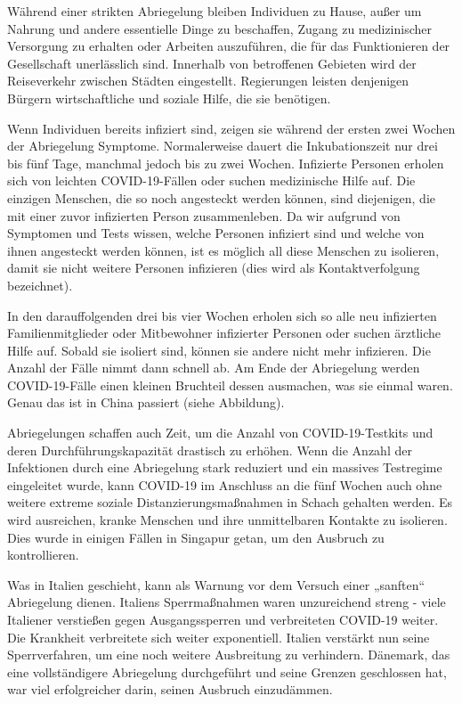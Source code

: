 \documentclass[onecolumn,journal]{IEEEtran}
\begin{document}
\begin{multicols}{2}

Während einer strikten Abriegelung bleiben Individuen zu Hause, außer um Nahrung und andere essentielle Dinge zu beschaffen, Zugang zu medizinischer Versorgung zu erhalten oder Arbeiten auszuführen, die für das Funktionieren der Gesellschaft unerlässlich sind. Innerhalb von betroffenen Gebieten wird der Reiseverkehr zwischen Städten eingestellt. Regierungen leisten denjenigen Bürgern wirtschaftliche und soziale Hilfe, die sie benötigen.

Wenn Individuen bereits infiziert sind, zeigen sie während der ersten zwei Wochen der Abriegelung Symptome. Normalerweise dauert die Inkubationszeit nur drei bis fünf Tage, manchmal jedoch bis zu zwei Wochen. Infizierte Personen erholen sich von leichten COVID-19-Fällen oder suchen medizinische Hilfe auf. Die einzigen Menschen, die so noch angesteckt werden können, sind diejenigen, die mit einer zuvor infizierten Person zusammenleben. Da wir aufgrund von Symptomen und Tests wissen, welche Personen infiziert sind und welche von ihnen angesteckt werden können, ist es möglich all diese Menschen zu isolieren, damit sie nicht weitere Personen infizieren (dies wird als Kontaktverfolgung bezeichnet).

In den darauffolgenden drei bis vier Wochen erholen sich so alle neu infizierten Familienmitglieder oder Mitbewohner infizierter Personen oder suchen ärztliche Hilfe auf. Sobald sie isoliert sind, können sie andere nicht mehr infizieren. Die Anzahl der Fälle nimmt dann schnell ab. Am Ende der Abriegelung werden COVID-19-Fälle einen kleinen Bruchteil dessen ausmachen, was sie einmal waren. Genau das ist in China passiert (siehe Abbildung).

Abriegelungen schaffen auch Zeit, um die Anzahl von COVID-19-Testkits und deren Durchführungskapazität drastisch zu erhöhen. Wenn die Anzahl der Infektionen durch eine Abriegelung stark reduziert und ein massives Testregime eingeleitet wurde, kann COVID-19 im Anschluss an die fünf Wochen auch ohne weitere extreme soziale Distanzierungsmaßnahmen in Schach gehalten werden. Es wird ausreichen, kranke Menschen und ihre unmittelbaren Kontakte zu isolieren. Dies wurde in einigen Fällen in Singapur getan, um den Ausbruch zu kontrollieren.

Was in Italien geschieht, kann als Warnung vor dem Versuch einer „sanften“ Abriegelung dienen. Italiens Sperrmaßnahmen waren unzureichend streng - viele Italiener verstießen gegen Ausgangssperren und verbreiteten COVID-19 weiter. Die Krankheit verbreitete sich weiter exponentiell. Italien verstärkt nun seine Sperrverfahren, um eine noch weitere Ausbreitung zu verhindern. Dänemark, das eine vollständigere Abriegelung durchgeführt und seine Grenzen geschlossen hat, war viel erfolgreicher darin, seinen Ausbruch einzudämmen.

\end{multicols}
\end{document}
